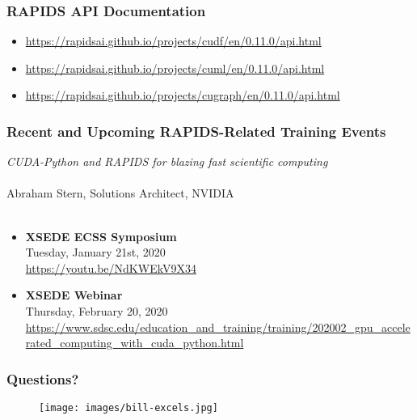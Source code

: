 \documentclass{beamer}
\begin{document}
\begin{frame}
   \frametitle{RAPIDS API Documentation}
   \begin{itemize}\setlength\itemsep{1.5em}
      \item \url{https://rapidsai.github.io/projects/cudf/en/0.11.0/api.html}
      \item \url{https://rapidsai.github.io/projects/cuml/en/0.11.0/api.html}
      \item \url{https://rapidsai.github.io/projects/cugraph/en/0.11.0/api.html}
   \end{itemize}
\end{frame}

\begin{frame}
   \frametitle{Recent and Upcoming RAPIDS-Related Training Events}
   \textit{CUDA-Python and RAPIDS for blazing fast scientific computing}
   \\ \ \\
   Abraham Stern, Solutions Architect, NVIDIA 
   \\ \ \\
   \begin{itemize}\setlength\itemsep{1.5em}
      \item \textbf{XSEDE ECSS Symposium} \\
            Tuesday, January 21st, 2020 \\
            \url{https://youtu.be/NdKWEkV9X34}  
      \item \textbf{XSEDE Webinar} \\
            Thursday, February 20, 2020 \\
\url{https://www.sdsc.edu/education_and_training/training/202002_gpu_accelerated_computing_with_cuda_python.html}
   \end{itemize}
\end{frame}

\begin{frame}
   \frametitle{Questions?}
   \begin{figure}[htbp]
      \texttt{[image: images/bill-excels.jpg]}
   \end{figure}
\end{frame}
\end{document}
